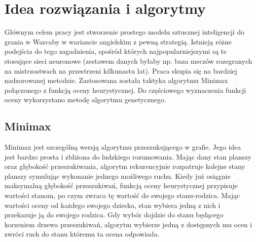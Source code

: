 \chapter{Idea rozwiązania i algorytmy}
\thispagestyle{chapterBeginStyle}
\label{rozdzial2}


Głównym celem pracy jest stworzenie prostego modelu sztucznej inteligencji do grania w Warcaby w wariancie angielskim z pewną strategią. Istnieją różne podejścia do tego zagadnienia, spośród których najpopularniejszymi są te stosujące sieci neuronowe (zestawem danych byłaby np. baza meczów rozegranych na mistrzostwach na przestrzeni kilkunastu lat). Praca skupia się na bardziej nadzorowanej metodzie. Zastosowana została taktyka algorytmu Minimax połączonego z funkcją oceny heurystycznej. Do częściowego wyznaczenia funkcji oceny wykorzystano metodę algorytmu genetycznego.

\section{Minimax}

Minimax jest szczególną wersją algorytmu przeszukującego w grafie. Jego idea jest bardzo prosta i zbliżona do ludzkiego rozumowania. Mając dany stan planszy oraz głębokość przeszukiwania, algorytm rekurencyjnie rozpatruje kolejne stany planszy symulując wykonanie jednego możliwego ruchu. Kiedy już osiągnie maksymalną głębokość przeszukiwań, funkcją oceny heurystycznej przypisuje wartości stanom, po czym zwraca tę wartość do swojego stanu-rodzica. Mając wartości oceny od każdego swojego dziecka, stan wybiera jedną z nich i przekazuje ją do swojego rodzica. Gdy wybór dojdzie do stanu będącego korzeniem drzewa przeszukiwań, algorytm wybierze jedną z dostępnych mu ocen i zwróci ruch do stanu któremu ta ocena odpowiada.

